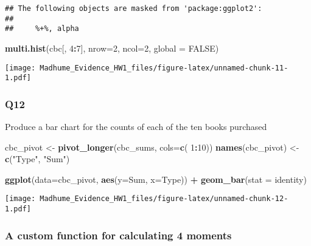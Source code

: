 \documentclass[
]{article}
\newenvironment{Shaded}{\begin{snugshade}}{\end{snugshade}}
\newcommand{\AttributeTok}[1]{\textcolor[rgb]{0.13,0.29,0.53}{#1}}
\newcommand{\ConstantTok}[1]{\textcolor[rgb]{0.56,0.35,0.01}{#1}}
\newcommand{\DecValTok}[1]{\textcolor[rgb]{0.00,0.00,0.81}{#1}}
\newcommand{\FunctionTok}[1]{\textcolor[rgb]{0.13,0.29,0.53}{\textbf{#1}}}
\newcommand{\NormalTok}[1]{#1}
\newcommand{\OtherTok}[1]{\textcolor[rgb]{0.56,0.35,0.01}{#1}}
\newcommand{\SpecialCharTok}[1]{\textcolor[rgb]{0.81,0.36,0.00}{\textbf{#1}}}
\newcommand{\StringTok}[1]{\textcolor[rgb]{0.31,0.60,0.02}{#1}}
\begin{document}
\begin{verbatim}
## The following objects are masked from 'package:ggplot2':
## 
##     %+%, alpha
\end{verbatim}

\begin{Shaded}
\begin{Highlighting}[]
\FunctionTok{multi.hist}\NormalTok{(cbc[, }\DecValTok{4}\SpecialCharTok{:}\DecValTok{7}\NormalTok{], }\AttributeTok{nrow=}\DecValTok{2}\NormalTok{, }\AttributeTok{ncol=}\DecValTok{2}\NormalTok{, }\AttributeTok{global =} \ConstantTok{FALSE}\NormalTok{)}
\end{Highlighting}
\end{Shaded}

\texttt{[image: Madhume\_Evidence\_HW1\_files/figure-latex/unnamed-chunk-11-1.pdf]}

\subsubsection{Q12}\label{q12}

Produce a bar chart for the counts of each of the ten books purchased

\begin{Shaded}
\begin{Highlighting}[]
\NormalTok{cbc\_pivot }\OtherTok{\textless{}{-}} \FunctionTok{pivot\_longer}\NormalTok{(cbc\_sums, }\AttributeTok{cols=}\FunctionTok{c}\NormalTok{( }\DecValTok{1}\SpecialCharTok{:}\DecValTok{10}\NormalTok{))}
\FunctionTok{names}\NormalTok{(cbc\_pivot) }\OtherTok{\textless{}{-}} \FunctionTok{c}\NormalTok{(}\StringTok{"Type"}\NormalTok{, }\StringTok{"Sum"}\NormalTok{)}

\FunctionTok{ggplot}\NormalTok{(}\AttributeTok{data=}\NormalTok{cbc\_pivot, }\FunctionTok{aes}\NormalTok{(}\AttributeTok{y=}\NormalTok{Sum, }\AttributeTok{x=}\NormalTok{Type)) }\SpecialCharTok{+}
  \FunctionTok{geom\_bar}\NormalTok{(}\AttributeTok{stat =} \StringTok{\textquotesingle{}identity\textquotesingle{}}\NormalTok{)}
\end{Highlighting}
\end{Shaded}

\texttt{[image: Madhume\_Evidence\_HW1\_files/figure-latex/unnamed-chunk-12-1.pdf]}

\subsubsection{A custom function for calculating 4
moments}\label{a-custom-function-for-calculating-4-moments}
\end{document}
